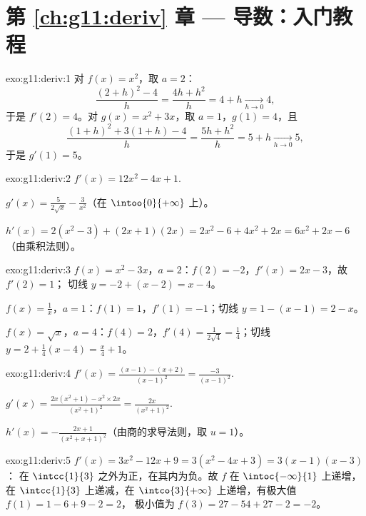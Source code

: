 \section*{第 \ref{ch:g11:deriv} 章 --- 导数：入门教程}

\begin{solution}{exo:g11:deriv:1}
对 $f(x) = x^2$，取 $a = 2$：
\[
\frac{(2+h)^2 - 4}{h} = \frac{4h + h^2}{h} = 4 + h
\xrightarrow[h\to0]{} 4,
\]
于是 $f'(2) = 4$。对 $g(x) = x^2 + 3x$，取 $a = 1$，$g(1) = 4$，且
\[
\frac{(1+h)^2 + 3(1+h) - 4}{h} = \frac{5h + h^2}{h} = 5 + h
\xrightarrow[h\to0]{} 5,
\]
于是 $g'(1) = 5$。
\end{solution}

\begin{solution}{exo:g11:deriv:2}
$f'(x) = 12x^2 - 4x + 1$.

$g'(x) = \frac{5}{2\sqrt x} - \frac{3}{x^2}$（在 $\intoo{0}{+\infty}$ 上）。

$h'(x) = 2(x^2 - 3) + (2x+1)(2x) = 2x^2 - 6 + 4x^2 + 2x
= 6x^2 + 2x - 6$（由乘积法则）。
\end{solution}

\begin{solution}{exo:g11:deriv:3}
$f(x) = x^2 - 3x$，$a = 2$：$f(2) = -2$，$f'(x) = 2x - 3$，故 $f'(2) = 1$；
切线 $y = -2 + (x - 2) = x - 4$。

$f(x) = \frac1x$，$a = 1$：$f(1) = 1$，$f'(1) = -1$；切线
$y = 1 - (x - 1) = 2 - x$。

$f(x) = \sqrt x$，$a = 4$：$f(4) = 2$，$f'(4) = \frac{1}{2\sqrt4} =
\frac14$；切线 $y = 2 + \frac14(x - 4) = \frac{x}{4} + 1$。
\end{solution}

\begin{solution}{exo:g11:deriv:4}
$f'(x) = \frac{(x-1) - (x+2)}{(x-1)^2} = \frac{-3}{(x-1)^2}$.

$g'(x) = \frac{2x(x^2+1) - x^2 \times 2x}{(x^2+1)^2}
= \frac{2x}{(x^2+1)^2}$.

$h'(x) = -\frac{2x+1}{(x^2+x+1)^2}$（由商的求导法则，取 $u = 1$）。
\end{solution}

\begin{solution}{exo:g11:deriv:5}
$f'(x) = 3x^2 - 12x + 9 = 3(x^2 - 4x + 3) = 3(x-1)(x-3)$：
在 $\intcc{1}{3}$ 之外为正，在其内为负。故 $f$ 在
$\intoc{-\infty}{1}$ 上递增，在 $\intcc{1}{3}$ 上递减，在
$\intco{3}{+\infty}$ 上递增，有极大值 $f(1) = 1 - 6 + 9 - 2 = 2$，
极小值为 $f(3) = 27 - 54 + 27 - 2 = -2$。
\end{solution}

